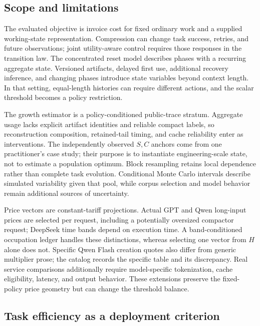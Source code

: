 \documentclass[sigconf,screen,nonacm]{acmart}
\begin{document}
\subsection{Scope and limitations}
\label{sec:limitations}

The evaluated objective is invoice cost for fixed ordinary work and a supplied
working-state representation. Compression can change task success, retries,
and future observations; joint utility-aware control requires those responses
in the transition law. The concentrated reset model describes phases with a
recurring aggregate state. Versioned artifacts, delayed first use, additional
recovery inference, and changing phases introduce state variables beyond
context length. In that setting, equal-length histories can require different
actions, and the scalar threshold becomes a policy restriction.

The growth estimator is a policy-conditioned public-trace stratum. Aggregate
usage lacks explicit artifact identities and reliable compact labels, so
reconstruction composition, retained-tail timing, and cache reliability enter
as interventions. The independently observed $S,C$ anchors come from one
practitioner's case study; their purpose is to instantiate engineering-scale
state, not to estimate a population optimum. Block resampling retains local
dependence rather than complete task evolution. Conditional Monte Carlo
intervals describe simulated variability given that pool, while corpus
selection and model behavior remain additional sources of uncertainty.

Price vectors are constant-tariff projections. Actual GPT and Qwen long-input
prices are selected per request, including a potentially oversized compactor
request; DeepSeek time bands depend on execution time. A band-conditioned
occupation ledger handles these distinctions, whereas selecting one vector
from $H$ alone does not. Specific Qwen Flash creation quotes also differ from
generic multiplier prose; the catalog records the specific table and its
discrepancy. Real service comparisons additionally require model-specific
tokenization, cache eligibility, latency, and output behavior. These extensions
preserve the fixed-policy price geometry but can change the threshold balance.

\subsection{Task efficiency as a deployment criterion}
\label{sec:task-efficiency}
\end{document}
